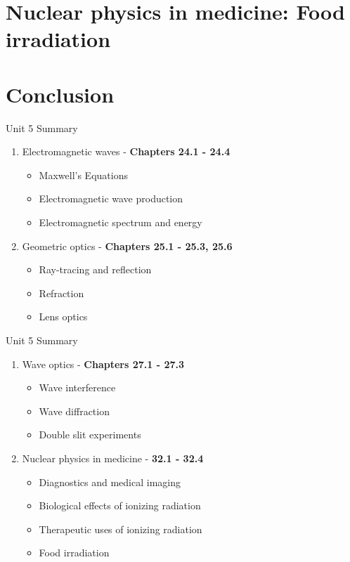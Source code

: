 \documentclass{beamer}
\begin{document}
\section{Nuclear physics in medicine: Food irradiation}

\section{Conclusion}

\begin{frame}{Unit 5 Summary}
\begin{enumerate}
\item Electromagnetic waves - \textbf{Chapters 24.1 - 24.4}
\begin{itemize}
\item Maxwell's Equations
\item Electromagnetic wave production
\item Electromagnetic spectrum and energy
\end{itemize}
\item Geometric optics - \textbf{Chapters 25.1 - 25.3, 25.6}
\begin{itemize}
\item Ray-tracing and reflection
\item Refraction
\item Lens optics
\end{itemize}
\end{enumerate}
\end{frame}

\begin{frame}{Unit 5 Summary}
\begin{enumerate}
\item Wave optics - \textbf{Chapters 27.1 - 27.3}
\begin{itemize}
\item Wave interference
\item Wave diffraction
\item Double slit experiments
\end{itemize}
\item Nuclear physics in medicine - \textbf{32.1 - 32.4}
\begin{itemize}
\item Diagnostics and medical imaging
\item Biological effects of ionizing radiation
\item Therapeutic uses of ionizing radiation
\item Food irradiation
\end{itemize}
\end{enumerate}
\end{frame}
\end{document}
